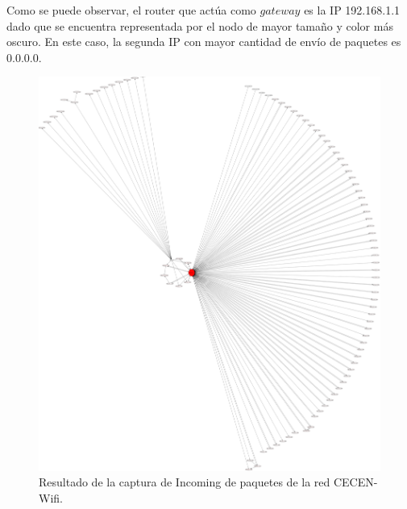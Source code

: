 \documentclass[10pt, a4paper]{article}
\begin{document}
Como se puede observar, el router que actúa como $gateway$ es la IP 192.168.1.1 dado que se encuentra representada por el nodo de mayor tamaño y color más oscuro. En este caso, la segunda IP con mayor cantidad de envío de paquetes es 0.0.0.0. 


\begin{figure}[H] %
\begin{center}
\includegraphics[width=450pt]{../imgs/cecen-incoming.png}
\caption{Resultado de la captura de Incoming de paquetes de la red CECEN-Wifi.}
\end{center}
\end{figure}
\end{document}

